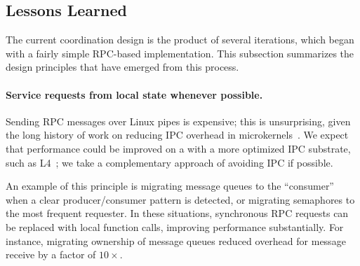 

\subsection{Lessons Learned}
\label{sec:graphene:namespaces:insights}

The current coordination design is the product of several iterations, which began 
with a fairly simple RPC-based implementation. %
This subsection summarizes the design principles that have emerged from this process.

\paragraph{Service requests from local state whenever possible.}
Sending RPC messages over Linux pipes is expensive;
this is unsurprising, given the long history of 
work on reducing IPC overhead in microkernels~\cite{liedtke93sosp,chen93memory}.  
We expect that \graphene{} performance could be improved on a 
\microkernel{} with
a more optimized IPC substrate, such as L4~\cite{liedtke95sosp,klein09sel4,elphinstone13microkernels};
we take a complementary approach of avoiding IPC if possible.

An example of this principle is migrating message queues to the ``consumer'' when a 
clear producer/consumer pattern is detected, or migrating semaphores to the most frequent requester.
In these situations, synchronous RPC requests can be replaced with local function calls, improving
performance substantially.  For instance, migrating ownership of message queues 
reduced overhead for message receive by a factor of $10\times$.

